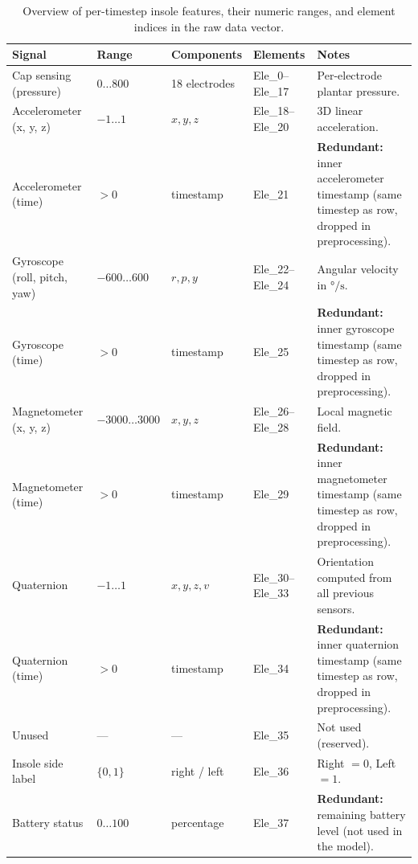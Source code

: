 \begin{table}[t]
    \centering
    \small
    \begin{tabularx}{\textwidth}{|l|l|l|l|X|}
      \hline
      \textbf{Signal} & \textbf{Range} & \textbf{Components} & \textbf{Elements} & \textbf{Notes} \\
      \hline
      Cap sensing (pressure) & \(0 \dots 800\) & 18 electrodes & Ele\_0--Ele\_17 & Per-electrode plantar pressure. \\
      \hline
      Accelerometer (x, y, z) & \(-1 \dots 1\) & \(x, y, z\) & Ele\_18--Ele\_20 & 3D linear acceleration. \\
      \hline
      Accelerometer (time) & \(> 0\) & timestamp & Ele\_21 & \textbf{Redundant:} inner accelerometer timestamp (same timestep as row, dropped in preprocessing). \\
      \hline
      Gyroscope (roll, pitch, yaw) & \(-600 \dots 600\) & \(r, p, y\) & Ele\_22--Ele\_24 & Angular velocity in \(\si{\degree/\second}\). \\
      \hline
      Gyroscope (time) & \(> 0\) & timestamp & Ele\_25 & \textbf{Redundant:} inner gyroscope timestamp (same timestep as row, dropped in preprocessing). \\
      \hline
      Magnetometer (x, y, z) & \(-3000 \dots 3000\) & \(x, y, z\) & Ele\_26--Ele\_28 & Local magnetic field. \\
      \hline
      Magnetometer (time) & \(> 0\) & timestamp & Ele\_29 & \textbf{Redundant:} inner magnetometer timestamp (same timestep as row, dropped in preprocessing). \\
      \hline
      Quaternion & \(-1 \dots 1\) & \(x, y, z, v\) & Ele\_30--Ele\_33 & Orientation computed from all previous sensors. \\
      \hline
      Quaternion (time) & \(> 0\) & timestamp & Ele\_34 & \textbf{Redundant:} inner quaternion timestamp (same timestep as row, dropped in preprocessing). \\
      \hline
      Unused & --- & --- & Ele\_35 & Not used (reserved). \\
      \hline
      Insole side label & \(\{0, 1\}\) & right / left & Ele\_36 & Right \(=0\), Left \(=1\). \\
      \hline
      Battery status & \(0 \dots 100\) & percentage & Ele\_37 & \textbf{Redundant:} remaining battery level (not used in the model). \\
      \hline
    \end{tabularx}
    \caption{Overview of per-timestep insole features, their numeric ranges, and element indices in the raw data vector.}
    \label{tab:insole-features}
  \end{table}
  